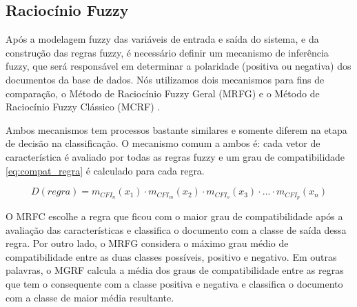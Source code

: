 \subsection{Raciocínio Fuzzy}

Após a modelagem fuzzy das variáveis de entrada e saída do sistema, e da construção das regras fuzzy, é necessário definir um mecanismo de inferência fuzzy, que será responsável em determinar a polaridade (positiva ou negativa) dos documentos da base de dados. Nós utilizamos dois mecanismos para fins de comparação, o Método de Raciocínio Fuzzy Geral (MRFG) e o Método de Raciocínio Fuzzy Clássico (MCRF) \cite{cordon1999proposal}.


Ambos mecanismos tem processos bastante similares e somente diferem na etapa de decisão na classificação. O mecanismo comum a ambos é: cada vetor de característica é avaliado por todas as regras fuzzy e um grau de compatibilidade \ref{eq:compat_regra} é calculado para cada regra. 


\begin{equation}
D(regra) = m_{CFI_n}(x_1) \cdot m_{CFI_m}(x_2) \cdot m_{CFI_o}(x_3) \cdot ...\cdot m_{CFI_p}(x_n)
\label{eq:compat_regra}
\end{equation}

O MRFC escolhe a regra que ficou com o maior grau de compatibilidade após a avaliação das características e classifica o documento com a classe de saída dessa regra.  Por outro lado, o MRFG considera o máximo grau médio de compatibilidade entre as duas classes possíveis, positivo e negativo. Em outras palavras, o MGRF calcula a média dos graus de compatibilidade entre as regras que tem o consequente com a classe positiva e negativa e classifica o documento com a classe de maior média resultante. 

